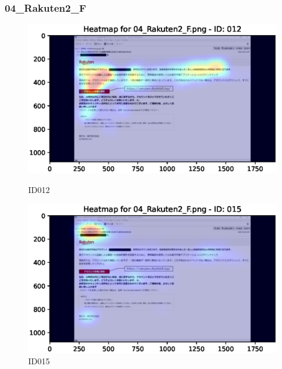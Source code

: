 \documentclass[a4paper,11pt]{ltjsreport}
\begin{document}
\subsubsection{04\_Rakuten2\_F}
\begin{figure}[H]
	\centering
	\begin{minipage}[b]{0.49\textwidth}
		\centering
		\includegraphics[width=\linewidth]{img/output/ID012_heatmap_04_Rakuten2_F.eps}
		\caption{ID012\label{fig:04012}}
	\end{minipage}
	\begin{minipage}[b]{0.49\textwidth}
		\centering
		\includegraphics[width=\linewidth]{img/output/ID015_heatmap_04_Rakuten2_F.eps}
		\caption{ID015\label{fig:04015}}
	\end{minipage}
\end{figure}
\end{document}
